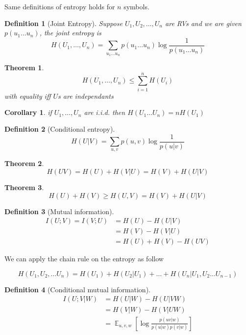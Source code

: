 \documentclass{article}
\newtheorem{theorem}{Theorem}[section]
\newtheorem{corollary}{Corollary}[theorem]
\newtheorem{definition}{Definition}[section]
\DeclareMathOperator{\E}{\mathbb{E}}%
\begin{document}
Same definitions of entropy holds for $n$ symbols.

\begin{definition}[Joint Entropy]
  Suppose $U_1, U_2, \dots, U_n$ are RVs and we are given $p(u_1 \dots u_n)$, the joint entropy is
  \[
    H(U_1, \dots, U_n) = \sum_{u_1 \dots u_n} p(u_1 \dots u_n) \log \frac 1 {p(u_1 \dots u_n)}
  \]
\end{definition}

\begin{theorem}
  \[
    H(U_1, \dots, U_n) \leq \sum_{i=1}^n H(U_i)
  \]
  with equality iff $U$s are independants
\end{theorem}

\begin{corollary}
  if $U_1, \dots, U_n$ are i.i.d. then $H(U_1 \dots U_n) = nH(U_1)$
\end{corollary}

\begin{definition}[Conditional entropy]
  \[
    H(U|V) = \sum_{u,v} p(u,v) \log \frac 1 {p(u|v)}
  \]
\end{definition}

\begin{theorem}
  \[
    H(UV) = H(U) + H(V|U) = H(V) + H(U|V)
  \]
\end{theorem}

\begin{theorem}
  \[
    H(U) + H(V) \geq H(U, V) = H(V) + H(U|V)
  \]
\end{theorem}

\begin{definition}[Mutual information]
  \begin{align*}
  I(U;V) = I(V;U) &= H(U) - H(U|V)\\
  &= H(V) - H(V|U)\\
  &= H(U) + H(V) - H(UV)
  \end{align*}
\end{definition}

We can apply the chain rule on the entropy as follow

\[
  H(U_1, U_2, \dots U_n) = H(U_1) + H(U_2|U_1) + \dots + H(U_n|U_1,U_2 \dots U_{n-1})
\]


\begin{definition}[Conditional mutual information]
  \begin{align*}
    I(U;V|W) &= H(U|W) - H(U|VW)\\
    &= H(V|W) - H(V|UW)\\
    &= \E_{u,v,w} \left[ \log \frac {p(uv|w)} {p(u|w)p(v|w)} \right]
  \end{align*}
\end{definition}
\end{document}
